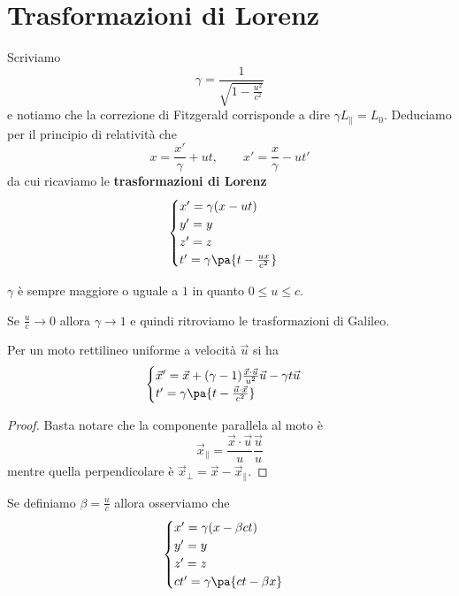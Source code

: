 \section{Trasformazioni di Lorenz}
Scriviamo \[\gamma=\frac1{\sqrt{1-\frac{u^2}{c^2}}}\] e notiamo che la correzione di Fitzgerald corrisponde a dire $\gamma L_\parallel=L_0$. Deduciamo per il principio di relativit\`a che
\[x=\frac{x'}\gamma+ut,\qquad x'=\frac{x}\gamma-ut'\]
da cui ricaviamo le \textbf{trasformazioni di Lorenz}
\[\begin{cases}
x'=\gamma (x-ut)\\
y'=y\\
z'=z\\
t'=\gamma\pa{t-\frac{ux}{c^2}}
\end{cases}\]

\begin{remark}
$\gamma$ \`e sempre maggiore o uguale a $1$ in quanto $0\leq u\leq c$.
\end{remark}

\begin{remark}
Se $\frac uc\to 0$ allora $\gamma\to 1$ e quindi ritroviamo le trasformazioni di Galileo.
\end{remark}

\noindent 
\begin{proposition}\label{LorenzDirezioneArbitraria}
Per un moto rettilineo uniforme a velocit\`a $\vec u$ si ha
\[\begin{cases}
\vec x'=\vec x+(\gamma -1)\frac{\vec x\cdot \vec u}{u^2}\vec u-\gamma t \vec u\\
t'=\gamma\pa{t-\frac{\vec u\cdot \vec x}{c^2}}
\end{cases}\]
\end{proposition}
\begin{proof}
Basta notare che la componente parallela al moto \`e
\[\vec x_\parallel=\frac{\vec x\cdot \vec u}{u}\frac{\vec u}{u}\]
mentre quella perpendicolare \`e $\vec x_\perp=\vec x-\vec x_\parallel$.
\end{proof}

\begin{remark}
Se definiamo $\beta=\frac uc$ allora osserviamo che
\[\begin{cases}
x'=\gamma (x-\beta ct)\\
y'=y\\
z'=z\\
ct'=\gamma\pa{ct-\beta x}
\end{cases}\]
\end{remark}


